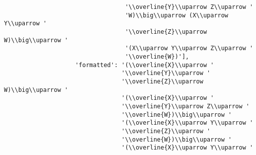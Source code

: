 \begin{verbatim}
                                  '\\overline{Y}\\uparrow Z\\uparrow '
                                  'W)\\big\\uparrow (X\\uparrow Y\\uparrow '
                                  '\\overline{Z}\\uparrow W)\\big\\uparrow '
                                  '(X\\uparrow Y\\uparrow Z\\uparrow '
                                  '\\overline{W})'],
                    'formatted': '(\\overline{X}\\uparrow '
                                 '\\overline{Y}\\uparrow '
                                 '\\overline{Z}\\uparrow W)\\big\\uparrow '
                                 '(\\overline{X}\\uparrow '
                                 '\\overline{Y}\\uparrow Z\\uparrow '
                                 '\\overline{W})\\big\\uparrow '
                                 '(\\overline{X}\\uparrow Y\\uparrow '
                                 '\\overline{Z}\\uparrow '
                                 '\\overline{W})\\big\\uparrow '
                                 '(\\overline{X}\\uparrow Y\\uparrow '

\end{verbatim}

